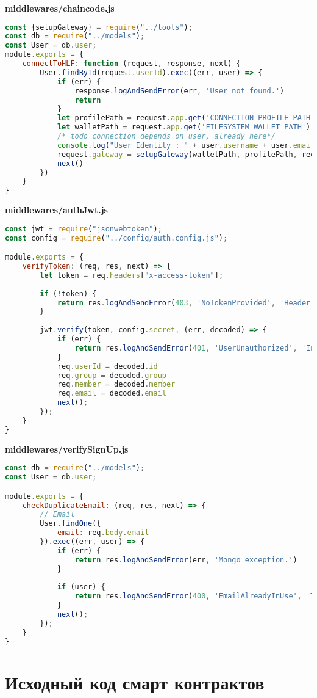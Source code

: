 \textbf{middlewares/chaincode.js}
\begin{lstlisting}[language=JavaScript]
const {setupGateway} = require("../tools");
const db = require("../models");
const User = db.user;
module.exports = {
	connectToHLF: function (request, response, next) {
		User.findById(request.userId).exec((err, user) => {
			if (err) {
				response.logAndSendError(err, 'User not found.')
				return
			}
			let profilePath = request.app.get('CONNECTION_PROFILE_PATH')
			let walletPath = request.app.get('FILESYSTEM_WALLET_PATH')
			/* todo connection depends on user, already here*/
			console.log("User Identity : " + user.username + user.email)
			request.gateway = setupGateway(walletPath, profilePath, request.userId)
			next()
		})
	}
}	
\end{lstlisting}

\textbf{middlewares/authJwt.js}
\begin{lstlisting}[language=JavaScript]
const jwt = require("jsonwebtoken");
const config = require("../config/auth.config.js");

module.exports = {
	verifyToken: (req, res, next) => {
		let token = req.headers["x-access-token"];
		
		if (!token) {
			return res.logAndSendError(403, 'NoTokenProvided', 'Header \'x-access-token\' is not specified.')
		}
		
		jwt.verify(token, config.secret, (err, decoded) => {
			if (err) {
				return res.logAndSendError(401, 'UserUnauthorized', 'Invalid token received.')
			}
			req.userId = decoded.id
			req.group = decoded.group
			req.member = decoded.member
			req.email = decoded.email
			next();
		});
	}
}	
\end{lstlisting}

\textbf{middlewares/verifySignUp.js}
\begin{lstlisting}[language=JavaScript]
const db = require("../models");
const User = db.user;

module.exports = {
	checkDuplicateEmail: (req, res, next) => {
		// Email
		User.findOne({
			email: req.body.email
		}).exec((err, user) => {
			if (err) {
				return res.logAndSendError(err, 'Mongo exception.')
			}
			
			if (user) {
				return res.logAndSendError(400, 'EmailAlreadyInUse', 'There is an existing user with email specified.')
			}
			next();
		});
	}
}	
\end{lstlisting}
\section{Исходный код смарт контрактов}\label{app:B2}

